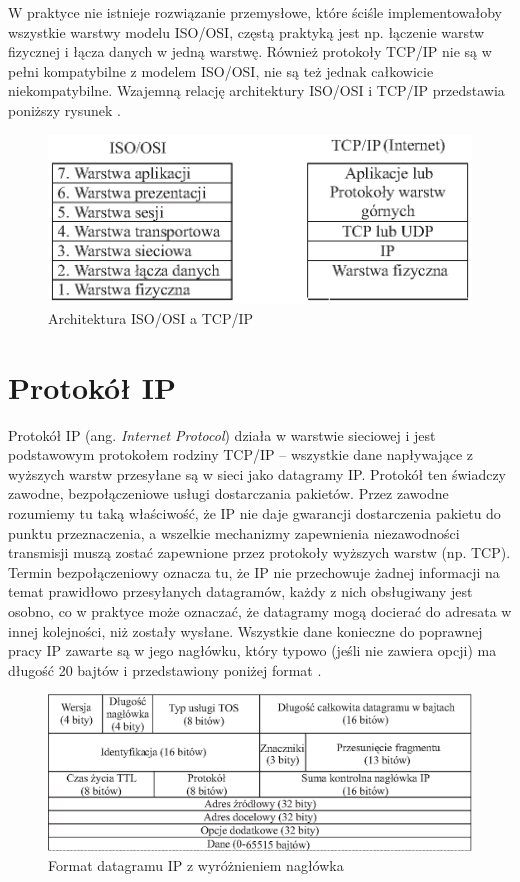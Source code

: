 W praktyce nie istnieje rozwiązanie przemysłowe, które ściśle implementowałoby wszystkie warstwy modelu ISO/OSI, 
częstą praktyką jest np. łączenie warstw fizycznej i łącza danych w jedną warstwę. Również protokoły TCP/IP nie 
są w pełni kompatybilne z modelem ISO/OSI, nie są też jednak całkowicie niekompatybilne. Wzajemną relację 
architektury ISO/OSI i TCP/IP przedstawia poniższy rysunek \cite{barylo1}.
\begin{figure}[h]
\centering
\includegraphics[width=5in]{./rysunki/architektura_ISO_a_tcp.eps}
\caption{Architektura ISO/OSI a TCP/IP}
\label{ISO_TCP}
\end{figure}
\section{Protokół IP}

Protokół IP (ang. \emph{Internet Protocol}) działa w warstwie sieciowej i jest podstawowym protokołem rodziny TCP/IP --
wszystkie dane napływające z wyższych warstw przesyłane są w sieci jako datagramy IP. Protokół ten świadczy 
zawodne, bezpołączeniowe usługi dostarczania pakietów. Przez zawodne rozumiemy tu taką właściwość, że IP nie 
daje gwarancji dostarczenia pakietu do punktu przeznaczenia, a wszelkie mechanizmy zapewnienia niezawodności transmisji muszą
zostać zapewnione przez protokoły wyższych warstw (np. TCP). Termin bezpołączeniowy oznacza tu, że IP nie 
przechowuje żadnej informacji na temat prawidłowo przesyłanych datagramów, każdy z nich obsługiwany jest osobno, 
co w praktyce może oznaczać, że datagramy mogą docierać do adresata w innej kolejności, niż zostały wysłane. 
Wszystkie dane konieczne do poprawnej pracy IP zawarte są w jego nagłówku, który typowo (jeśli nie zawiera 
opcji) ma długość 20 bajtów i przedstawiony poniżej format \cite{barylo2}.

\begin{figure}[h]
\centering
\includegraphics[width=5in]{./rysunki/datagram_ip.eps}
\caption{Format datagramu IP z wyróżnieniem nagłówka}
\label{datagram_ip}
\end{figure}


